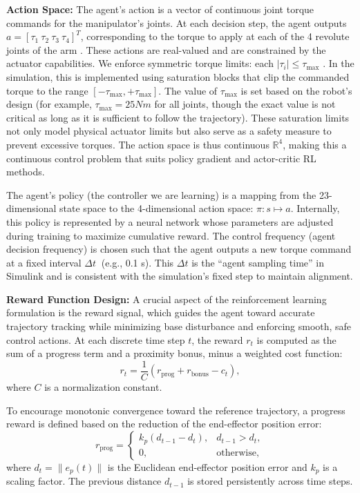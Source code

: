 \documentclass{ieeeaccess}
\begin{document}
\textbf{Action Space:} The agent’s action is a vector of continuous joint torque commands for the
manipulator’s joints. At each decision step, the agent outputs $a = [\tau_{1}~ \tau_{2}~
\tau_{3}~ \tau_{4}]^T$, corresponding to the torque to apply at each of the 4 revolute joints
of the arm \cite{b2,b7}. These actions are real-valued and are constrained by the actuator capabilities. We enforce
symmetric torque limits: each $|\tau_{i}| \leq \tau_{\max}$ . In the simulation, this
is implemented using saturation blocks that clip the commanded torque to the range $[-\tau_{\max},
+\tau_{\max}]$. The value of $\tau_{\max}$ is set based on the robot’s design (for example,
$\tau_{\max} = 25 Nm$ for all joints, though the exact value is not critical as long as it is sufficient to
follow the trajectory). These saturation limits not only model physical actuator limits but also serve as a
safety measure to prevent excessive torques. The action space is thus continuous $\mathbb{R}^4$, making
this a continuous control problem that suits policy gradient and actor-critic RL methods.

The agent’s policy (the controller we are learning) is a mapping from the 23-dimensional state space to
the 4-dimensional action space: $\pi: s \mapsto  a$. Internally, this policy is represented by a neural network
whose parameters are adjusted during training to maximize cumulative reward. The
control frequency (agent decision frequency) is chosen such that the agent outputs a new torque
command at a fixed interval $\Delta t~$ (e.g., 0.1 s). This $\Delta t$ is the “agent sampling time” in Simulink and is
consistent with the simulation’s fixed step to maintain alignment.


\noindent
\textbf{Reward Function Design:} A crucial aspect of the reinforcement learning formulation is the reward signal, which guides the agent toward accurate trajectory tracking 
while minimizing base disturbance and enforcing smooth, safe control actions.
At each discrete time step $t$, the reward $r_t$ is computed as the sum of a progress term and a proximity bonus, minus a weighted cost function:
\begin{equation}
r_t = \frac{1}{C}\left( r_{\text{prog}} + r_{\text{bonus}} - c_t \right),
\label{eq:reward}
\end{equation}
where $C$ is a normalization constant.

To encourage monotonic convergence toward the reference trajectory, a progress reward is defined based on the reduction of the end-effector position error:
\begin{equation}
r_{\text{prog}} = 
\begin{cases}
k_p \left( d_{t-1} - d_t \right), & d_{t-1} > d_t,\\
0, & \text{otherwise},
\end{cases}
\end{equation}
where $d_t = \|e_p(t)\|$ is the Euclidean end-effector position error and $k_p$ is a scaling factor. The previous distance $d_{t-1}$ is stored persistently across time steps.
\end{document}
